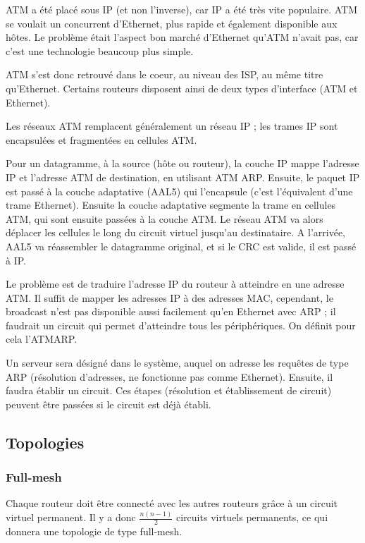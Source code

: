	ATM a été placé sous IP (et non l'inverse), car IP a été très vite populaire. ATM se voulait un concurrent d'Ethernet, plus rapide et également disponible aux hôtes. Le problème était l'aspect bon marché d'Ethernet qu'ATM n'avait pas, car c'est une technologie beaucoup plus simple.
	
	ATM s'est donc retrouvé dans le coeur, au niveau des ISP, au même titre qu'Ethernet. Certains routeurs disposent ainsi de deux types d'interface (ATM et Ethernet).	
	
	Les réseaux ATM remplacent généralement un réseau IP ; les trames IP sont encapsulées et fragmentées en cellules ATM.
	
	
	Pour un datagramme, à la source (hôte ou routeur), la couche IP mappe l'adresse IP et l'adresse ATM de destination, en utilisant ATM ARP. Ensuite, le paquet IP est passé à la couche adaptative (AAL5) qui l'encapsule (c'est l'équivalent d'une trame Ethernet). Ensuite la couche adaptative segmente la trame en cellules ATM, qui sont ensuite passées à la couche ATM.
	Le réseau ATM va alors déplacer les cellules le long du circuit virtuel jusqu'au destinataire.
	A l'arrivée, AAL5 va réassembler le datagramme original, et si le CRC est valide, il est passé à IP.

	Le problème est de traduire l'adresse IP du routeur à atteindre en une adresse ATM. Il suffit de mapper les adresses IP à des adresses MAC, cependant, le broadcast n'est pas disponible aussi facilement qu'en Ethernet avec ARP ; il faudrait un circuit qui permet d'atteindre tous les périphériques. On définit pour cela l'ATMARP.
	
	Un serveur sera désigné dans le système, auquel on adresse les requêtes de type ARP (résolution d'adresses, ne fonctionne pas comme Ethernet). Ensuite, il faudra établir un circuit. Ces étapes (résolution et établissement de circuit) peuvent être passées si le circuit est déjà établi.
	
		\subsection{Topologies}
			\subsubsection{Full-mesh}
		
			Chaque routeur doit être connecté avec les autres routeurs grâce à un circuit virtuel permanent. Il y a donc $\frac{n (n - 1)}{2}$ circuits virtuels permanents, ce qui donnera une topologie de type full-mesh.
		
